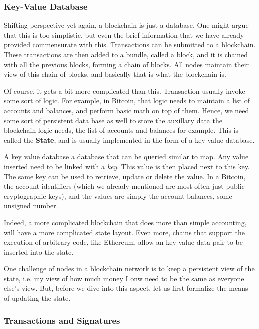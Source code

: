 \subsubsection{Key-Value Database} \label{chap_bg:subsec:kvdb}

Shifting perspective yet again, a blockchain is just a database. One might argue that this is too
simplistic, but even the brief information that we have already provided commensurate with this.
Transactions can be submitted to a blockchain. These transactions are then added to a bundle, called
a block, and it is chained with all the previous blocks, forming a chain of blocks. All nodes
maintain their view of this chain of blocks, and basically that is what the blockchain is.

Of course, it gets a bit more complicated than this. Transaction usually invoke some sort of logic.
For example, in Bitcoin, that logic needs to maintain a list of accounts and balances, and perform
basic math on top of them. Hence, we need some sort of persistent data base as well to store the
auxillary data the blockchain logic needs, the list of accounts and balances for example. This is
called the \textbf{State}, and is usually implemented in the form of a key-value database.

A key value database a database that can be queried similar to map. Any value inserted need to be
linked with a \textit{key}. This value is then placed next to this key. The same key can be used to
retrieve, update or delete the value. In a Bitcoin, the account identifiers (which we already
mentioned are most often just public cryptographic keys), and the values are simply the account
balances, some unsigned number.

Indeed, a more complicated blockchain that does more than simple accounting, will have a more
complicated state layout. Even more, chains that support the execution of arbitrary code, like
Ethereum, allow an key value data pair to be inserted into the state.

One challenge of nodes in a blockchain network is to keep a persistent view of the state, i.e. my
view of how much money I onw need to be the same as everyone else's view. But, before we dive into
this aspect, let us first formalize the means of updating the state.

\subsubsection{Transactions and Signatures} \label{chap_bg:subsec:transaction_sig}

